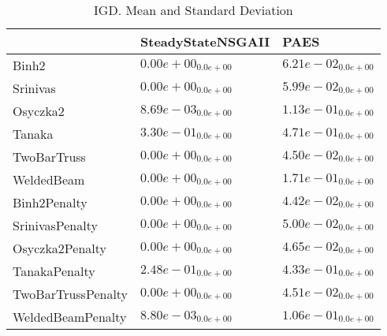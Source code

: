 \documentclass{article}
\begin{document}
\begin{table}
\caption{IGD. Mean and Standard Deviation}
\label{table: IGD}
\centering
\begin{scriptsize}
\begin{tabular}{lll}
\hline & SteadyStateNSGAII &  PAES\\
\hline 
Binh2 & \cellcolor{gray95}$  0.00e+00_{ 0.0e+00}$ & \cellcolor{gray25}$  6.21e-02_{ 0.0e+00}$ \\
Srinivas & \cellcolor{gray95}$  0.00e+00_{ 0.0e+00}$ & \cellcolor{gray25}$  5.99e-02_{ 0.0e+00}$ \\
Osyczka2 & \cellcolor{gray95}$  8.69e-03_{ 0.0e+00}$ & \cellcolor{gray25}$  1.13e-01_{ 0.0e+00}$ \\
Tanaka & \cellcolor{gray95}$  3.30e-01_{ 0.0e+00}$ & \cellcolor{gray25}$  4.71e-01_{ 0.0e+00}$ \\
TwoBarTruss & \cellcolor{gray95}$  0.00e+00_{ 0.0e+00}$ & \cellcolor{gray25}$  4.50e-02_{ 0.0e+00}$ \\
WeldedBeam & \cellcolor{gray95}$  0.00e+00_{ 0.0e+00}$ & \cellcolor{gray25}$  1.71e-01_{ 0.0e+00}$ \\
Binh2Penalty & \cellcolor{gray95}$  0.00e+00_{ 0.0e+00}$ & \cellcolor{gray25}$  4.42e-02_{ 0.0e+00}$ \\
SrinivasPenalty & \cellcolor{gray95}$  0.00e+00_{ 0.0e+00}$ & \cellcolor{gray25}$  5.00e-02_{ 0.0e+00}$ \\
Osyczka2Penalty & \cellcolor{gray95}$  0.00e+00_{ 0.0e+00}$ & \cellcolor{gray25}$  4.65e-02_{ 0.0e+00}$ \\
TanakaPenalty & \cellcolor{gray95}$  2.48e-01_{ 0.0e+00}$ & \cellcolor{gray25}$  4.33e-01_{ 0.0e+00}$ \\
TwoBarTrussPenalty & \cellcolor{gray95}$  0.00e+00_{ 0.0e+00}$ & \cellcolor{gray25}$  4.51e-02_{ 0.0e+00}$ \\
WeldedBeamPenalty & \cellcolor{gray95}$  8.80e-03_{ 0.0e+00}$ & \cellcolor{gray25}$  1.06e-01_{ 0.0e+00}$ \\
\hline
\end{tabular}
\end{scriptsize}
\end{table}
\end{document}
